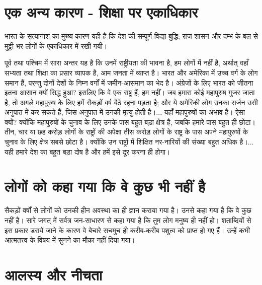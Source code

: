 \section*{एक अन्य कारण - शिक्षा पर एकाधिकार}


भारत के सत्यानाश का मुख्य कारण यही है कि देश की सम्पूर्ण विद्या-बुद्धि; राज-शासन और दम्भ के बल से मुट्ठी भर लोगों के एकाधिकार में रखी गयी। 

पूर्व तथा पश्चिम में सारा अन्तर यह है कि उनमें राष्ट्रीयता की भावना है, हम लोगों में नहीं है, अर्थात् वहाँ सभ्यता तथा शिक्षा का प्रसार व्यापक है, आम जनता में व्याप्त है। भारत और अमेरिका में उच्च वर्ग के लोग समान हैं, परन्तु दोनों देशों के निम्न वर्गों में जमीन-आसमान का भेद है। अंग्रेजों के लिए भारत को जीतना इतना आसान क्यों सिद्ध हुआ? इसलिए कि वे एक राष्ट्र हैं, हम नहीं। जब हमारा कोई महापुरुष गुजर जाता है, तो अगले महापुरुष के लिए हमें सैकड़ों वर्ष बैठे रहना पड़ता है; और ये अमेरिकी लोग उनका सर्जन उसी अनुपात में कर सकते हैं, जिस अनुपात में उनकी मृत्यु होती है।... यहाँ महापुरुषों का अभाव है। ऐसा क्यों? क्योंकि महापुरुषों के चुनाव के लिए उनके पास बहुत बड़ा क्षेत्र है, जबकि हमारे पास बहुत ही छोटा। तीन, चार या छह करोड़ लोगों के राष्ट्रों की अपेक्षा तीस करोड़ लोगों के राष्ट्र के पास अपने महापुरुषों के चुनाव के लिए क्षेत्र सबसे छोटा है। क्योंकि उन राष्ट्रों में शिक्षित नर-नारियों की संख्या बहुत अधिक है।... यही हमारे देश का बहुत बड़ा दोष है और हमें इसे दूर करना ही होगा।


\section*{लोगों को कहा गया कि वे कुछ भी नहीं है}


सैकड़ों वर्षों से लोगों को उनकी हीन अवस्था का ही ज्ञान कराया गया है। उनसे कहा गया है कि वे कुछ नहीं है। सारे जगत् में सर्वत्र जन-साधारण से कहा गया है कि तुम लोग मनुष्य ही नहीं हो। शताब्दियों से इस प्रकार डराये जाने के कारण वे बेचारे सचमुच ही करीब-करीब पशुत्व को प्राप्त हो गए हैं। उन्हें कभी आत्मतत्त्व के विषय में सुनने का मौका नहीं दिया गया।


\section*{आलस्य और नीचता}


